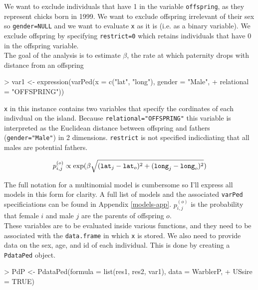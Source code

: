\documentclass{article}
\begin{document}
We want to exclude individuals that have 1 in the variable \texttt{offspring}, as they represent chicks born in 1999.  We want to exclude offspring irrelevant of their sex so  \texttt{gender=NULL}  and we want to evaluate \texttt{x} as it is (i.e. as a binary variable).  We exclude offspring by specifying \texttt{restrict=0} which retains individuals that have 0 in the offspring variable.\\

The goal of the analysis is to estimate $\beta$, the rate at which paternity drops with distance from an offspring

\begin{Schunk}
\begin{Sinput}
> var1 <- expression(varPed(x = c("lat", "long"), gender = "Male", 
+     relational = "OFFSPRING"))
\end{Sinput}
\end{Schunk}

\texttt{x} in this instance contains two variables that specify the cordinates of each indivdual on the island. Because \texttt{relational="OFFSPRING"} this variable is interpreted as the Euclidean distance between offspring and fathers (\texttt{gender="Male"}) in 2 dimensions.  \texttt{restrict} is not specified indicdiating that all males are potential fathers. 

\begin{equation}
p^{(o)}_{i,j} \propto \textrm{exp}(\beta \sqrt{(\textrm{\texttt{lat}}_{j}-\textrm{\texttt{lat}}_{o})^{2}+(\textrm{\texttt{long}}_{j}-\textrm{\texttt{long}}_{o})^{2}})
\label{dist-eq}
\end{equation}

The full notation for a multinomial model is cumbersome so I'll express all models in this form for clarity. A full list of models and the associated \texttt{varPed} specificiations can be found in Appendix \ref{models-app}. $p^{(o)}_{i,j}$ is the probability that female $i$ and male $j$ are the parents of offspring $o$.\\  

 These variables are to be evaluated inside various functions, and they need to be associated with the \texttt{data.frame} in which \texttt{x} is stored. We also need to provide data on the sex, age, and id of each individual.  This is done by creating a \texttt{PdataPed} object.

\begin{Schunk}
\begin{Sinput}
> PdP <- PdataPed(formula = list(res1, res2, var1), data = WarblerP, 
+     USsire = TRUE)
\end{Sinput}
\end{Schunk}
\end{document}
